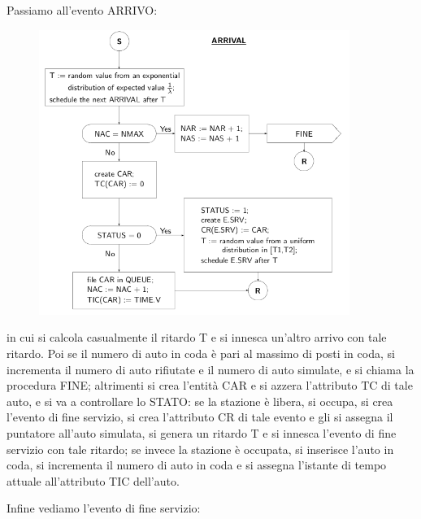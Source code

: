 \documentclass[11pt]{book}
\begin{document}
Passiamo all'evento ARRIVO:

\begin{figure}[H]
  \centering
  \includegraphics[width=0.9\textwidth]{images/cap11fig38.png}
\end{figure}

in cui si calcola casualmente il ritardo T e si innesca un'altro
arrivo con tale ritardo. Poi se il numero di auto in coda \`e pari al
massimo di posti in coda, si incrementa il numero di auto rifiutate e
il numero di auto simulate, e si chiama la procedura FINE; altrimenti
si crea l'entit\`a CAR e si azzera l'attributo TC di tale auto, e si va
a controllare lo STATO: se la stazione \`e libera, si occupa, si crea
l'evento di fine servizio, si crea l'attributo CR di tale evento e gli
si assegna il puntatore all'auto simulata, si genera un ritardo T e si
innesca l'evento di fine servizio con tale ritardo; se invece la
stazione \`e occupata, si inserisce l'auto in coda, si incrementa il
numero di auto in coda e si assegna l'istante di tempo attuale
all'attributo TIC dell'auto. 

Infine vediamo l'evento di fine servizio:
\end{document}
